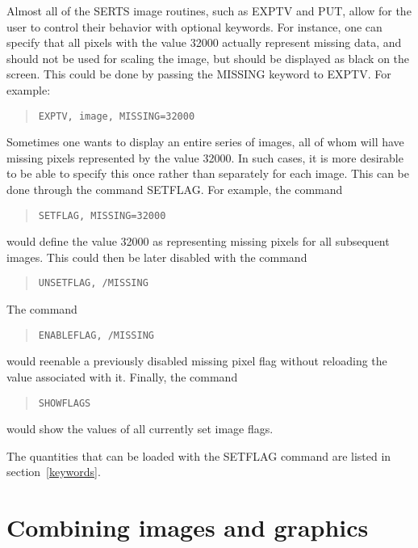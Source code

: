 Almost all of the SERTS image routines, such as EXPTV and PUT, allow for the
user to control their behavior with optional keywords.  For instance, one can
specify that all pixels with the value 32000 actually represent missing data,
and should not be used for scaling the image, but should be displayed as black
on the screen.  This could be done by passing the MISSING keyword to EXPTV.
For example:
\begin{quote}
\begin{verbatim}
EXPTV, image, MISSING=32000
\end{verbatim}
\end{quote}
Sometimes one wants to display an entire series of images, all of whom will
have missing pixels represented by the value 32000.  In such cases, it is more
desirable to be able to specify this once rather than separately for each
image.  This can be done through the command SETFLAG.  For example, the command
\begin{quote}
\begin{verbatim}
SETFLAG, MISSING=32000
\end{verbatim}
\end{quote}
would define the value 32000 as representing missing pixels for all subsequent
images.  This could then be later disabled with the command
\begin{quote}
\begin{verbatim}
UNSETFLAG, /MISSING
\end{verbatim}
\end{quote}
The command
\begin{quote}
\begin{verbatim}
ENABLEFLAG, /MISSING
\end{verbatim}
\end{quote}
would reenable a previously disabled missing pixel flag without reloading the
value associated with it.  Finally, the command
\begin{quote}
\begin{verbatim}
SHOWFLAGS
\end{verbatim}
\end{quote}
would show the values of all currently set image flags.

The quantities that can be loaded with the SETFLAG command are listed in
section~\ref{keywords}.

\section{Combining images and graphics}

